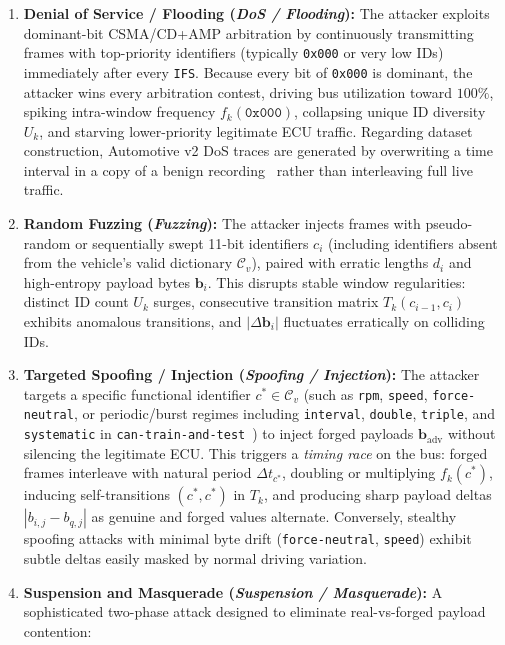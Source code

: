 \documentclass[12pt, a4paper, reqno, oneside]{book}
\DeclareRobustCommand{\code}[1]{\nolinkurl{#1}}
\begin{document}
\begin{enumerate}
    \item \textbf{Denial of Service / Flooding (\textit{DoS / Flooding}):} The attacker exploits dominant-bit \mbox{CSMA/CD+AMP} arbitration by continuously transmitting frames with top-priority identifiers (typically \texttt{0x000} or very low IDs) immediately after every \code{IFS}. Because every bit of \texttt{0x000} is dominant, the attacker wins every arbitration contest, driving bus utilization toward $100\%$, spiking intra-window frequency $f_k(\texttt{0x000})$, collapsing unique ID diversity $U_k$, and starving lower-priority legitimate ECU traffic. Regarding dataset construction, Automotive v2 DoS traces are generated by overwriting a time interval in a copy of a benign recording~\cite{dupont2019automotive} rather than interleaving full live traffic.
    \item \textbf{Random Fuzzing (\textit{Fuzzing}):} The attacker injects frames with pseudo-random or sequentially swept 11-bit identifiers $c_i$ (including identifiers absent from the vehicle's valid dictionary $\mathcal{C}_v$), paired with erratic lengths $d_i$ and high-entropy payload bytes $\mathbf{b}_i$. This disrupts stable window regularities: distinct ID count $U_k$ surges, consecutive transition matrix $T_k(c_{i-1}, c_i)$ exhibits anomalous transitions, and $|\Delta \mathbf{b}_i|$ fluctuates erratically on colliding IDs.
    \item \textbf{Targeted Spoofing / Injection (\textit{Spoofing / Injection}):} The attacker targets a specific functional identifier $c^* \in \mathcal{C}_v$ (such as \code{rpm}, \code{speed}, \code{force-neutral}, or periodic/burst regimes including \code{interval}, \code{double}, \code{triple}, and \code{systematic} in \texttt{can-train-and-test}~\cite{lampe2024curated}) to inject forged payloads $\mathbf{b}_{\text{adv}}$ without silencing the legitimate ECU. This triggers a \textit{timing race} on the bus: forged frames interleave with natural period $\Delta t_{c^*}$, doubling or multiplying $f_k(c^*)$, inducing self-transitions $(c^*, c^*)$ in $T_k$, and producing sharp payload deltas $|b_{i,j} - b_{q,j}|$ as genuine and forged values alternate. Conversely, stealthy spoofing attacks with minimal byte drift (\code{force-neutral}, \code{speed}) exhibit subtle deltas easily masked by normal driving variation.
    \item \textbf{Suspension and Masquerade (\textit{Suspension / Masquerade}):} A sophisticated two-phase attack designed to eliminate real-vs-forged payload contention:

\end{enumerate}
\end{document}

